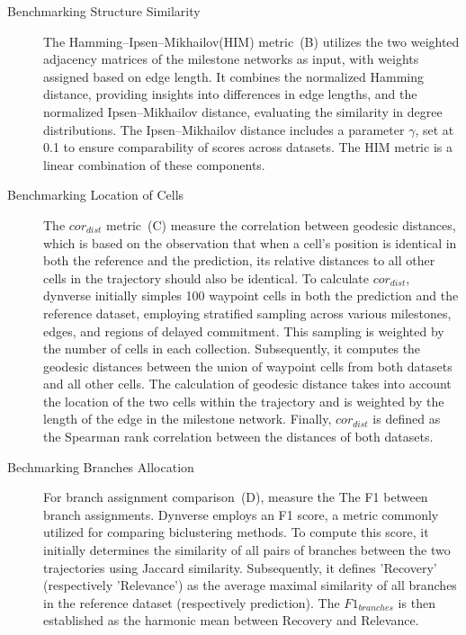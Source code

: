 \begin{description}
	\item[Benchmarking Structure Similarity]
	The Hamming–Ipsen–Mikhailov(HIM) metric~(B) utilizes the two weighted adjacency matrices of the milestone networks as input, with weights assigned based on edge length. It combines the normalized Hamming distance, providing insights into differences in edge lengths, and the normalized Ipsen–Mikhailov distance, evaluating the similarity in degree distributions. The Ipsen–Mikhailov distance includes a parameter $\gamma$, set at 0.1 to ensure comparability of scores across datasets. The HIM metric is a linear combination of these components.

	\item[Benchmarking Location of Cells]
	The $cor_{dist}$ metric~(C) measure the correlation between geodesic distances, which is based on the observation that when a cell's position is identical in both the reference and the prediction, its relative distances to all other cells in the trajectory should also be identical. To calculate $cor_{dist}$, dynverse initially simples \num{100} waypoint cells in both the prediction and the reference dataset, employing stratified sampling across various milestones, edges, and regions of delayed commitment. This sampling is weighted by the number of cells in each collection. Subsequently, it computes the geodesic distances between the union of waypoint cells from both datasets and all other cells. The calculation of geodesic distance takes into account the location of the two cells within the trajectory and is weighted by the length of the edge in the milestone network. Finally, $cor_{dist}$ is defined as the Spearman rank correlation between the distances of both datasets.

	\item[Bechmarking Branches Allocation]
	For branch assignment comparison~(D), measure the The F1 between branch assignments. Dynverse employs an F1 score, a metric commonly utilized for comparing biclustering methods. To compute this score, it initially determines the similarity of all pairs of branches between the two trajectories using Jaccard similarity. Subsequently, it defines 'Recovery' (respectively 'Relevance') as the average maximal similarity of all branches in the reference dataset (respectively prediction). The $F1_{branches}$ is then established as the harmonic mean between Recovery and Relevance.


\end{description}
